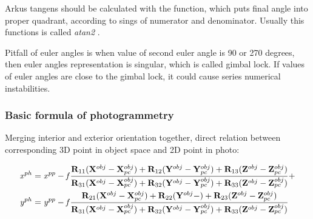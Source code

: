 \documentclass[a4paper,12pt]{article}
\newcommand{\ematr}[1]{
{\bf #1}
}
\newcommand{\evect}[1]{
{\bf #1}
}
\newcommand{\escal}[1]{
{\it #1}
}
\newcommand{\term}[1]{
{\it #1}
}
\begin{document}

Arkus tangens should be calculated with the function, which puts final angle into proper quadrant, according to sings of numerator 
and denominator. Usually this functions is called \term{atan2}. 

Pitfall of euler angles is when value of second euler angle is 90 or 270 degrees,  
then euler angles representation is singular, which is called gimbal lock. 
If values  of euler angles are close to the gimbal lock, it could cause series numerical instabilities.

\subsubsection{Basic formula of photogrammetry}

Merging interior and exterior orientation together, direct relation between corresponding 3D point in object space and 2D point
in photo:

\begin{equation}
\label{eq:col_eqs}
\begin{split}
&\escal{x}^{ph} = \escal{x}^{pp} -\escal{f}\frac{\ematr{R}_{11}(\evect{X}^{obj} - \evect{X}^{obj}_{pc}) + 
                                  \ematr{R}_{12}(\evect{Y}^{obj} - \evect{Y}^{obj}_{pc}) + 
                                  \ematr{R}_{13}(\evect{Z}^{obj} - \evect{Z}^{obj}_{pc})                                  
                                  }{
				  \ematr{R}_{31}(\evect{X}^{obj} - \evect{X}^{obj}_{pc}) + 
                                  \ematr{R}_{32}(\evect{Y}^{obj} - \evect{Y}^{obj}_{pc}) + 
                                  \ematr{R}_{33}(\evect{Z}^{obj} - \evect{Z}^{obj}_{pc})     
                                  } +  \\
&\escal{y}^{ph} = \escal{y}^{pp} -\escal{f}\frac{\ematr{R}_{21}(\evect{X}^{obj} - \evect{X}^{obj}_{pc}) + 
                                  \ematr{R}_{22}(\evect{Y}^{obj} - ) + 
                                  \ematr{R}_{23}(\evect{Z}^{obj} - \evect{Z}^{obj}_{pc})                                  
                                  }{
				  \ematr{R}_{31}(\evect{X}^{obj} - \evect{X}^{obj}_{pc}) + 
                                  \ematr{R}_{32}(\evect{Y}^{obj} - \evect{Y}^{obj}_{pc}) + 
                                  \ematr{R}_{33}(\evect{Z}^{obj} - \evect{Z}^{obj}_{pc})     
                                  }
\end{split}
\end{equation}
\end{document}
